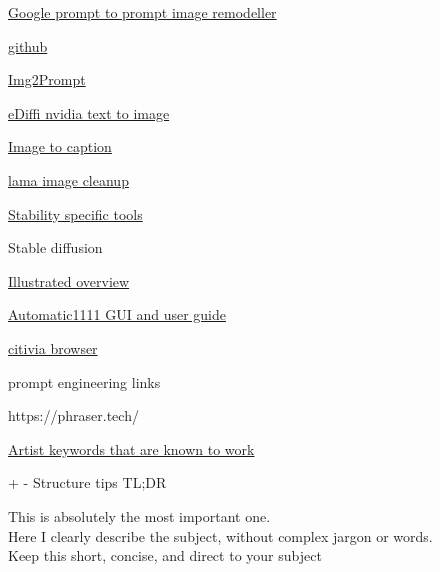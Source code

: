         \href{https://www.youtube.com/watch?v=lHcPtbZ0Mnc}{Google prompt
        to prompt image remodeller}

         
        \tightlist
         
          \href{https://github.com/google/prompt-to-prompt}{github}
         
       
        \href{https://replicate.com/methexis-inc\#}{Img2Prompt}
       
        \href{https://deepimagination.cc/eDiffi/}{eDiffi nvidia text to
        image}
       
        \href{https://laion.ai/blog/laion-coco/}{Image to caption}
       
        \href{https://github.com/Sanster/lama-cleaner}{lama image
        cleanup}
       
        \href{https://sdtools.org/}{Stability specific tools}

         
        \tightlist
         
          Stable diffusion

           
          \tightlist
           
            \href{https://jalammar.github.io/illustrated-stable-diffusion/}{Illustrated
            overview}
           
            \href{https://www.thosesixfaces.com/post/stable-diffusion-getting-started-windows}{Automatic1111
            GUI and user guide}

             
            \tightlist
             
              \href{https://github.com/Vetchems/sd-civitai-browser}{citivia
              browser}
             
           
            prompt engineering links

             
            \tightlist
             
              https://phraser.tech/
             
              \href{https://docs.google.com/document/d/1SaQx1uJ9LBRS7c6OsZIaeanJGkUdsUBjk9X4dC59BaA/edit\#}{Artist
              keywords that are known to work}
             
              \protect\hypertarget{show1_1}{}{+}
              \protect\hypertarget{hide1_1}{}{-} Structure tips TL;DR

               
               
                This is absolutely the most important one.\\
                Here I clearly describe the subject, without complex
                jargon or words.\\
                Keep this short, concise, and direct to your subject
               
